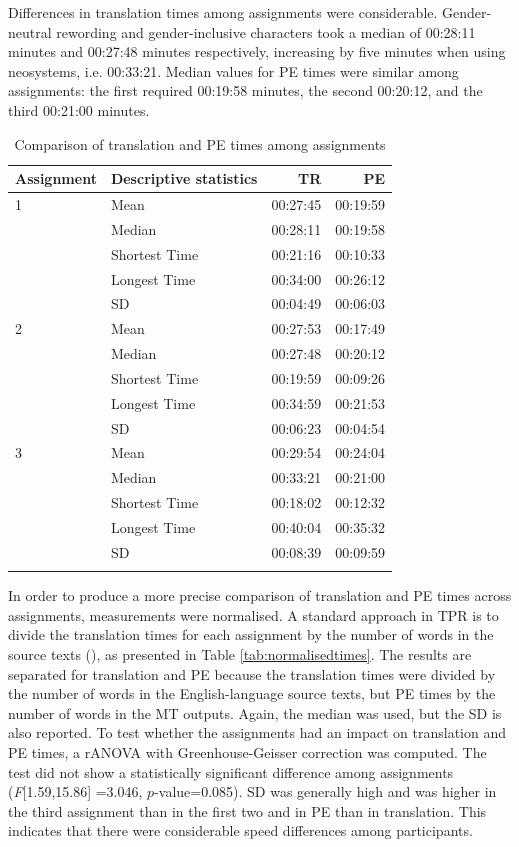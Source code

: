 Differences in translation times among assignments were considerable. Gender-neutral rewording and gender-inclusive characters took a median of 00:28:11 minutes and 00:27:48 minutes respectively, increasing by five minutes when using neosystems, i.e. 00:33:21. Median values for PE times were similar among assignments: the first required 00:19:58 minutes, the second 00:20:12, and the third 00:21:00 minutes.

\begin{table}[ht]
    \caption{Comparison of translation and PE times among assignments}
    \centering
    \begin{tabular}{llrr} \lsptoprule
    \textbf{Assignment} & \textbf{Descriptive statistics} & \textbf{TR} & \textbf{PE} \\
\midrule
    1 & Mean & 00:27:45 & 00:19:59 \\
      & Median & 00:28:11 & 00:19:58 \\
      & Shortest Time & 00:21:16 & 00:10:33 \\
      & Longest Time & 00:34:00 & 00:26:12 \\
      & SD & 00:04:49 & 00:06:03 \\
      \midrule
    2 & Mean & 00:27:53 & 00:17:49 \\
      & Median & 00:27:48 & 00:20:12 \\
      & Shortest Time & 00:19:59 & 00:09:26 \\
      & Longest Time & 00:34:59 & 00:21:53 \\
      & SD & 00:06:23 & 00:04:54 \\
      \midrule
    3 & Mean & 00:29:54 & 00:24:04 \\
      & Median & 00:33:21 & 00:21:00 \\
      & Shortest Time & 00:18:02 & 00:12:32 \\
      & Longest Time & 00:40:04 & 00:35:32 \\
      & SD & 00:08:39 & 00:09:59 \\
\lspbottomrule
    \end{tabular}
    \label{tab:times2}
\end{table}

In order to produce a more precise comparison of translation and PE times across assignments, measurements were normalised. A standard approach in TPR is to divide the translation times for each assignment by the number of words in the source texts (\cite{laubli-etal-2013-assessing}), as presented in Table \ref{tab:normalisedtimes}. The results are separated for translation and PE because the translation times were divided by the number of words in the English-language source texts, but PE times by the number of words in the MT outputs. Again, the median was used, but the SD is also reported. To test whether the assignments had an impact on translation and PE times, a rANOVA with Greenhouse-Geisser correction was computed. The test did not show a statistically significant difference among assignments (\textit{F}[1.59,15.86] =3.046, $p$-value=0.085). SD was generally high and was higher in the third assignment than in the first two and in PE than in translation. This indicates that there were considerable speed differences among participants. 

